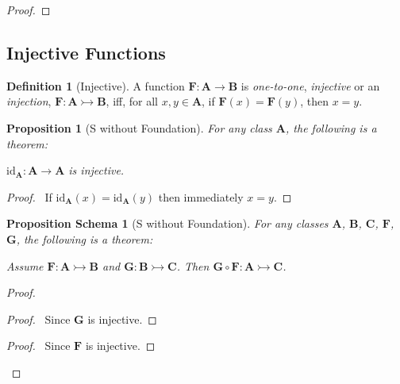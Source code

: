 \documentclass{book}
\let\qed\relax
\newtheorem{prop}[ax]{Proposition}
\newtheorem{props}[ax]{Proposition Schema}
\theoremstyle{definition}
\newtheorem{df}[ax]{Definition}
\newcommand{\id}[1]{\ensuremath{\mathrm{id}_{#1}}}
\begin{document}
\begin{proof}
\pf
{}
\qed
\end{proof}

\subsection{Injective Functions}

\begin{df}[Injective]
A function $\mathbf{F} : \mathbf{A} \rightarrow \mathbf{B}$ is \emph{one-to-one}, \emph{injective} or an \emph{injection}, $\mathbf{F} : \mathbf{A} \rightarrowtail \mathbf{B}$, iff, for all $x,y \in \mathbf{A}$, if $\mathbf{F}(x) = \mathbf{F}(y)$, then $x = y$.
\end{df}

\begin{prop}[S without Foundation]
\label{prop:idinj}
For any class $\mathbf{A}$, the following is a theorem:

$\id{\mathbf{A}} : \mathbf{A} \rightarrow \mathbf{A}$ is injective.
\end{prop}

\begin{proof}
\pf\ If $\id{\mathbf{A}}(x) = \id{\mathbf{A}}(y)$ then immediately $x = y$. \qed
\end{proof}

\begin{props}[S without Foundation]
\label{prop:compinj}
For any classes $\mathbf{A}$, $\mathbf{B}$, $\mathbf{C}$, $\mathbf{F}$, $\mathbf{G}$, the following is a theorem:

Assume $\mathbf{F} : \mathbf{A} \rightarrowtail \mathbf{B}$ and $\mathbf{G} : \mathbf{B} \rightarrowtail \mathbf{C}$. Then $\mathbf{G} \circ \mathbf{F} : \mathbf{A} \rightarrowtail \mathbf{C}$.
\end{props}

\begin{proof}
\pf
{}
\begin{proof}
	\pf\ Since $\mathbf{G}$ is injective.
\end{proof}
\begin{proof}
	\pf\ Since $\mathbf{F}$ is injective.
\end{proof}
\qed
\end{proof}
\end{document}
